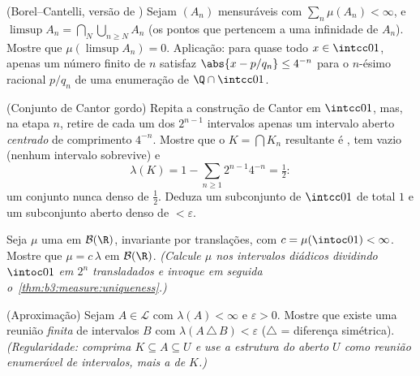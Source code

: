 \begin{exercise}[$\star\star$]\label{exo:b3:measure:4}
(Borel--Cantelli, versão de ) Sejam $(A_n)$ mensuráveis com
$\sum_n\mu(A_n) < \infty$, e $\limsup A_n =
\bigcap_N\bigcup_{n\geq N}A_n$ (os pontos que pertencem a uma infinidade de $A_n$).
Mostre que $\mu(\limsup A_n) = 0$. Aplicação: para quase todo $x \in \intcc01$, apenas um número
finito de $n$ satisfaz $\abs{x - p/q_n} \leq 4^{-n}$ para o $n$-ésimo racional
$p/q_n$ de uma enumeração de $\Q\cap\intcc01$.
\end{exercise}

\begin{exercise}[$\star\star$]\label{exo:b3:measure:5}
(Conjunto de Cantor gordo) Repita a construção de Cantor em $\intcc01$, mas,
na etapa $n$, retire de cada um dos $2^{n-1}$ intervalos apenas um
intervalo aberto \emph{centrado} de comprimento $4^{-n}$. Mostre que
o $K = \bigcap K_n$ resultante é , tem  vazio (nenhum intervalo
sobrevive) e
\[
\lambda(K) = 1 - \sum_{n\geq1}2^{n-1}4^{-n} = \tfrac12 :
\]
um conjunto nunca denso de  $\frac12$. Deduza um subconjunto
\emph{} de $\intcc01$ de  total $1$ e um subconjunto aberto
denso de  $< \varepsilon$.
\end{exercise}

\begin{exercise}[$\star\star$]\label{exo:b3:measure:6}
Seja $\mu$ uma  em $\mathcal B(\R)$, invariante por translações, com
$c = \mu(\intoc01) < \infty$. Mostre que $\mu =
c\,\lambda$ em $\mathcal B(\R)$. \emph{(Calcule $\mu$ nos intervalos
diádicos dividindo $\intoc01$ em $2^n$ transladados e invoque em seguida
o~\cref{thm:b3:measure:uniqueness}.)}
\end{exercise}

\begin{exercise}[$\star\star$]\label{exo:b3:measure:7}
(Aproximação) Sejam $A \in \mathcal L$ com $\lambda(A) <
\infty$ e $\varepsilon > 0$. Mostre que existe uma
reunião \emph{finita} de intervalos $B$ com $\lambda(A\,\triangle\,B) <
\varepsilon$ ($\triangle$ = diferença
simétrica). \emph{(Regularidade: comprima $K \subseteq A \subseteq U$ e use a estrutura do
aberto $U$ como reunião enumerável de intervalos, mais a 
de $K$.)}
\end{exercise}

